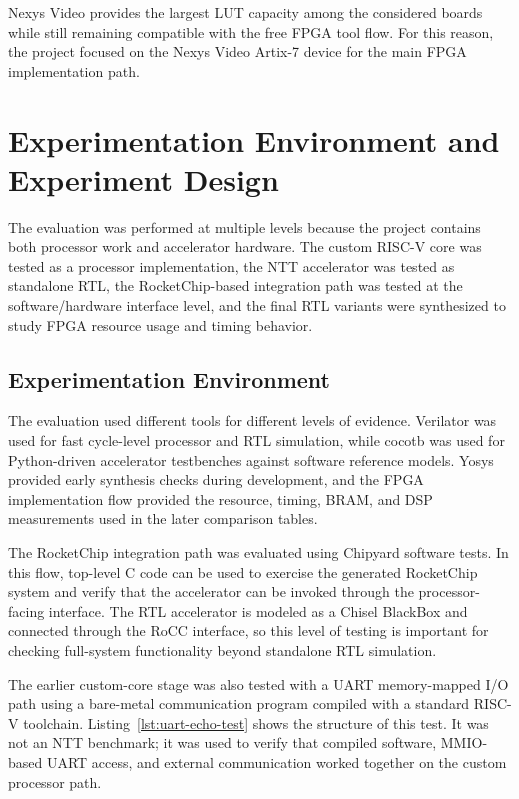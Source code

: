 \documentclass[a4paper, 12pt, titlepage]{article}
\begin{document}
Nexys Video provides the largest LUT capacity among the considered boards while
still remaining compatible with the free FPGA tool flow. For this reason, the
project focused on the Nexys Video Artix-7 device for the main FPGA
implementation path.

\newpage
\section{Experimentation Environment and Experiment Design}

The evaluation was performed at multiple levels because the project contains both processor work and accelerator hardware. The custom RISC-V core was tested as a processor implementation, the NTT accelerator was tested as standalone RTL, the RocketChip-based integration path was tested at the software/hardware interface level, and the final RTL variants were synthesized to study FPGA resource usage and timing behavior.

\subsection{Experimentation Environment}

The evaluation used different tools for different levels of evidence.
Verilator was used for fast cycle-level processor and RTL simulation, while
cocotb was used for Python-driven accelerator testbenches against software
reference models. Yosys provided early synthesis checks during development, and
the FPGA implementation flow provided the resource, timing, BRAM, and DSP
measurements used in the later comparison tables.

The RocketChip integration path was evaluated using Chipyard software
tests. In this flow, top-level C code can be used to exercise the generated
RocketChip system and verify that the accelerator can be invoked through the
processor-facing interface. The RTL accelerator is modeled as a Chisel BlackBox
and connected through the RoCC interface, so this level of testing is important
for checking full-system functionality beyond standalone RTL simulation.

The earlier custom-core stage was also tested with a UART memory-mapped I/O path
using a bare-metal communication program compiled with a standard RISC-V
toolchain. Listing~\ref{lst:uart-echo-test} shows the structure of this test.
It was not an NTT benchmark; it was used to verify that compiled software,
MMIO-based UART access, and external communication worked together on the custom
processor path.
\end{document}
